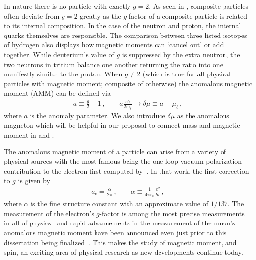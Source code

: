 In nature there is no particle with exactly $g\!=\!2$. As seen in , composite particles often deviate from $g\!=\!2$ greatly as the $g$-factor of a composite particle is related to its internal composition. In the case of the neutron and proton, the internal quarks themselves are responsible. The comparison between three listed isotopes of hydrogen also displays how magnetic moments can `cancel out' or add together. While deuterium's value of $g$ is suppressed by the extra neutron, the two neutrons in tritium balance one another returning the ratio into one manifestly similar to the proton. When $g\neq2$ (which is true for all physical particles with magnetic moment; composite of otherwise) the anomalous magnetic moment (AMM) can be defined via 
\begin{gather}
    \label{amm:1}
    a\equiv\frac{g}{2}-1\,,\qquad
    a\frac{e\hbar}{2m_{\ell}}\rightarrow\delta\mu\equiv\mu-\mu_{\ell}\,,
\end{gather}
where $a$ is the anomaly parameter. We also introduce $\delta\mu$ as the anomalous magneton which will be helpful in our proposal to connect mass and magnetic moment in  and .

The anomalous magnetic moment of a particle can arise from a variety of physical sources with the most famous being the one-loop vacuum polarization contribution to the electron first computed by~\cite{Schwinger:1951nm}. In that work, the first correction to $g$ is given by
\begin{gather}
    a_{e} = \frac{\alpha}{2\pi}\,,\qquad
    \alpha\equiv\frac{1}{4\pi\varepsilon_{0}}\frac{e^{2}}{\hbar c}\,,
\end{gather}
where $\alpha$ is the fine structure constant with an approximate value of $1/137$. The measurement of the electron's $g$-factor is among the most precise measurements in all of physics~\citep{Tiesinga:2021myr} and rapid advancements in the measurement of the muon's anomalous magnetic moment have been announced even just prior to this dissertation being finalized~\citep{Muong-2:2023cdq}. This makes the study of magnetic moment, and spin, an exciting area of physical research as new developments continue today.

